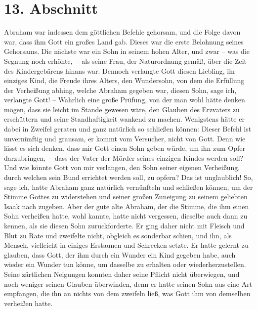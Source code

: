 \section{13. Abschnitt} \label{kap4_ab13}

Abraham war indessen dem göttlichen Befehle gehorsam,
und die Folge davon war,
dass ihm Gott ein großes Land gab. Dieses war die erste Belohnung seines
Gehorsams. Die nächste war ein Sohn in seinem hohen Alter, und zwar -- was die
Segnung noch erhöhte,~-- als seine Frau, der Naturordnung gemäß, über die Zeit
des Kindergebärens hinans war.
Dennoch verlangte Gott diesen
Liebling, ihr einziges Kind, die Freude ihres Alters, den Wundersohn, von dem
die Erfüllung der Verheißung abhing, welche Abraham gegeben war, diesen Sohn,
sage ich, verlangte Gott! -- Wahrlich eine große Prüfung, von der man wohl hätte
denken mögen, dass sie leicht im Stande gewesen wäre, den Glauben des Erzvaters
zu erschüttern und seine Standhaftigkeit wankend zu machen. Wenigstens hätte er
dabei in Zweifel geraten und ganz natürlich so schließen können: Dieser Befehl
ist unvernünftig und grausam, er kommt vom Versucher, nicht von Gott. Denn wie
lässt es sich denken, dass mir Gott einen Sohn geben würde, um ihn zum Opfer
darzubringen,~-- dass der Vater der Mörder seines einzigen Kindes werden soll?
-- Und wie könnte Gott von mir verlangen, den Sohn seiner eigenen Verheißung,
durch welchen sein Bund errichtet werden soll, zu opfern? Das ist unglaublich!
So, sage ich, hatte Abraham ganz natürlich vernünfteln und schließen können, um
der Stimme Gottes zu widerstehen und seiner großen Zuneigung zu seinem geliebten
Isaak nach zugeben. Aber der gute alte Abraham, der die
Stimme, die ihm einen
Sohn verheißen hatte, wohl kannte, hatte nicht vergessen, dieselbe auch dann zu
kennen, als sie diesen Sohn zuruckforderte. Er ging daher nicht mit Fleisch und
Blut zu Rate und zweifelte nicht, obgleich es sonderbar schien, und ihn, als
Mensch, vielleicht in einiges Erstaunen und Schrecken setzte. Er hatte gelernt
zu glauben, dass Gott, der ihm durch ein Wunder ein Kind gegeben habe, auch
wieder ein Wunder tun könne, um dasselbe zu erhalten oder wiederherzustellen.
Seine zärtlichen Neigungen konnten daher seine Pflicht nicht überwiegen, und
noch weniger seinen Glauben überwinden, denn er hatte seinen Sohn aus eine Art
empfangen, die ihn an nichts von dem zweifeln ließ, was Gott ihm von demselben
verheißen hatte.

\medskip

